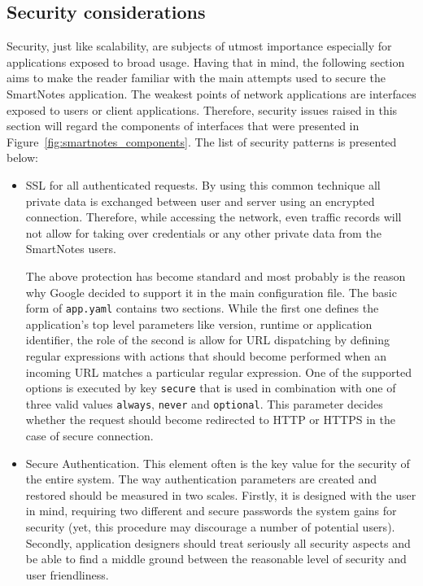 \subsection{Security considerations}\label{subsec:security}
Security, just like scalability, are subjects of utmost importance especially for applications exposed to broad usage. Having that in mind, the following section aims to make the reader familiar with the main attempts used to secure the SmartNotes application. The weakest points of network applications are interfaces exposed to users or client applications. Therefore, security issues raised in this section will regard the components of interfaces that were presented in Figure~\ref{fig:smartnotes_components}. The list of security patterns is presented below:
\begin{itemize}
\item{SSL for all authenticated requests. By using this common technique all private data is exchanged between user and server using an encrypted connection. Therefore, while accessing the network, even traffic records will not allow for taking over credentials or any other private data from the SmartNotes users.
 
The above protection has become standard and most probably is the reason why Google decided to support it in the main configuration file. The basic form of \texttt{app.yaml} contains two sections. While the first one defines the application’s top level parameters like version, runtime or application identifier, the role of the second is allow for URL dispatching by defining regular expressions with actions that should become performed when an incoming URL matches a particular regular expression. One of the supported options is executed by key \texttt{secure} that is used in combination with one of three valid values \texttt{always}, \texttt{never} and \texttt{optional}. This parameter decides whether the request should become redirected to HTTP or HTTPS in the case of secure connection.}
 
\item{Secure Authentication. This element often is the key value for the security of the entire system. The way authentication parameters are created and restored should be measured in two scales. Firstly, it is designed with the user in mind, requiring two different and secure passwords the system gains for security (yet, this procedure may discourage a number of potential users). Secondly, application designers should treat seriously all security aspects and be able to find a middle ground between the reasonable level of security and user friendliness.
 
}
\end{itemize}
